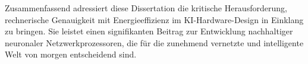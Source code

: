 \documentclass{article}
\begin{document}
	Zusammenfassend adressiert diese Dissertation die kritische Herausforderung, rechnerische Genauigkeit mit Energieeffizienz im KI-Hardware-Design in Einklang zu bringen. Sie leistet einen signifikanten Beitrag zur Entwicklung nachhaltiger neuronaler Netzwerkprozessoren, die für die zunehmend vernetzte und intelligente Welt von morgen entscheidend sind.
\end{document}
